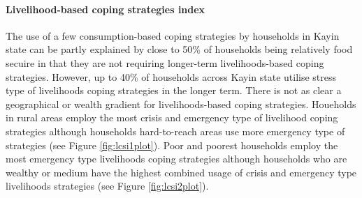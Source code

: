 \documentclass[12pt,a4paper]{article}
\let\oldparagraph\paragraph
\renewcommand{\paragraph}[1]{\oldparagraph{#1}\mbox{}}
\begin{document}
\hypertarget{lcsi-results}{%
\paragraph{Livelihood-based coping strategies index}\label{lcsi-results}}

The use of a few consumption-based coping strategies by households in Kayin state can be partly explained by close to 50\% of households being relatively food secuire in that they are not requiring longer-term livelihoods-based coping strategies. However, up to 40\% of households across Kayin state utilise stress type of livelihoods coping strategies in the longer term. There is not as clear a geographical or wealth gradient for livelihoods-based coping strategies. Houeholds in rural areas employ the most crisis and emergency type of livelihood coping strategies although households hard-to-reach areas use more emergency type of strategies (see Figure \ref{fig:lcsi1plot}). Poor and poorest households employ the most emergency type livelihoods coping strategies although households who are wealthy or medium have the highest combined usage of crisis and emergency type livelihoods strategies (see Figure \ref{fig:lcsi2plot}).
\end{document}
